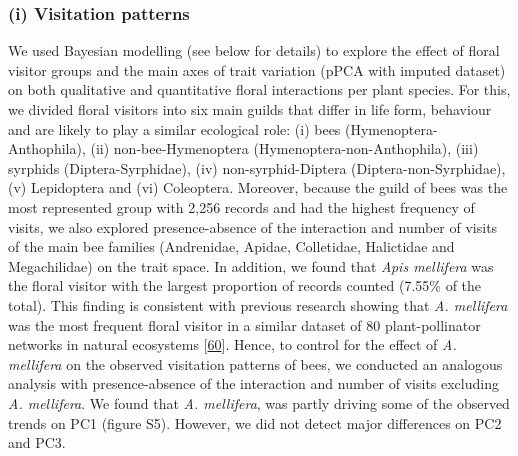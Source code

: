 \documentclass[
  12pt,
  a4paper,
]{article}
\begin{document}
\hypertarget{i-visitation-patterns}{%
\subsubsection{(i) Visitation patterns}\label{i-visitation-patterns}}

We used Bayesian modelling (see below for details) to explore the effect of floral visitor groups and the main axes of trait variation (pPCA with imputed dataset) on both qualitative and quantitative floral interactions per plant species. For this, we divided floral visitors into six main guilds that differ in life form, behaviour and are likely to play a similar ecological role: (i) bees (Hymenoptera-Anthophila), (ii) non-bee-Hymenoptera (Hymenoptera-non-Anthophila), (iii) syrphids (Diptera-Syrphidae), (iv) non-syrphid-Diptera (Diptera-non-Syrphidae), (v) Lepidoptera and (vi) Coleoptera. Moreover, because the guild of bees was the most represented group with 2,256 records and had the highest frequency of visits, we also explored presence-absence of the interaction and number of visits of the main bee families (Andrenidae, Apidae, Colletidae, Halictidae and Megachilidae) on the trait space. In addition, we found that \emph{Apis mellifera} was the floral visitor with the largest proportion of records counted (7.55\% of the total). This finding is consistent with previous research showing that \emph{A. mellifera} was the most frequent floral visitor in a similar dataset of 80 plant-pollinator networks in natural ecosystems {[}\protect\hyperlink{ref-hung2018}{60}{]}. Hence, to control for the effect of \emph{A. mellifera} on the observed visitation patterns of bees, we conducted an analogous analysis with presence-absence of the interaction and number of visits excluding \emph{A. mellifera}. We found that \emph{A. mellifera}, was partly driving some of the observed trends on PC1 (figure S5). However, we did not detect major differences on PC2 and PC3.
\end{document}
